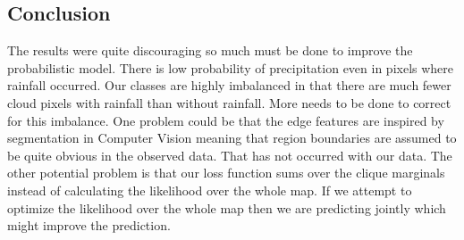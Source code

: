 \subsection{Conclusion}

The results were quite discouraging so much must be done to improve the probabilistic model. There is low probability of precipitation even in pixels where rainfall occurred. Our classes are highly imbalanced in that there are much fewer cloud pixels with rainfall than without rainfall. More needs to be done to correct for this imbalance. One problem could be that the edge features are inspired by segmentation in Computer Vision meaning that region boundaries are assumed to be quite obvious in the observed data. That has not occurred with our data. The other potential problem is that our loss function sums over the clique marginals instead of calculating the likelihood over the whole map. If we attempt to optimize the likelihood over the whole map then we are predicting jointly which might improve the prediction. 


